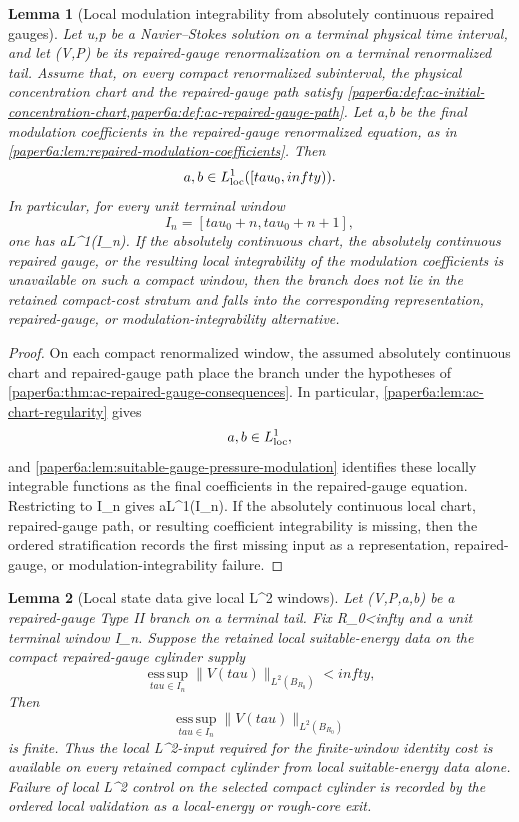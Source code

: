 \documentclass[11pt]{amsart}
\def\({}%
\def\){}%
\def\tau{tau}%
\def\infty{infty}%
\theoremstyle{plain}
\newtheorem{lemma}[lemma]{Lemma}
\theoremstyle{definition}
\theoremstyle{remark}
\begin{document}
\begin{lemma}[Local modulation integrability from absolutely continuous repaired gauges]
\label{paper7:lem:local-modulation-integrability}
Let \(u,p\) be a Navier--Stokes solution on a terminal physical time interval,
and let \((V,P)\) be its repaired-gauge renormalization on a terminal
renormalized tail.  Assume that, on every compact renormalized subinterval, the
physical concentration chart and the repaired-gauge path satisfy
\cref{paper6a:def:ac-initial-concentration-chart,paper6a:def:ac-repaired-gauge-path}.
Let \(a,b\) be the final modulation coefficients in the repaired-gauge
renormalized equation, as in
\cref{paper6a:lem:repaired-modulation-coefficients}.  Then
\[
  a,b\in L^1_{\rm loc}([\tau_0,\infty)).
\]
In particular, for every unit terminal window
\[
  I_n=[\tau_0+n,\tau_0+n+1],
\]
one has \(a\in L^1(I_n)\).  If the absolutely continuous chart, the
absolutely continuous repaired gauge, or the resulting local integrability of
the modulation coefficients is unavailable on such a compact window, then the
branch does not lie in the retained compact-cost stratum and falls into the
corresponding representation, repaired-gauge, or modulation-integrability
alternative.
\end{lemma}

\begin{proof}
On each compact renormalized window, the assumed absolutely continuous chart
and repaired-gauge path place the branch under the hypotheses of
\cref{paper6a:thm:ac-repaired-gauge-consequences}.  In particular,
\cref{paper6a:lem:ac-chart-regularity} gives
\[
  a,b\in L^1_{\rm loc},
\]
and \cref{paper6a:lem:suitable-gauge-pressure-modulation} identifies these
locally integrable functions as the final coefficients in the repaired-gauge
equation.  Restricting to \(I_n\) gives \(a\in L^1(I_n)\).  If the absolutely
continuous local chart, repaired-gauge path, or resulting coefficient
integrability is missing, then the ordered stratification records the first
missing input as a representation, repaired-gauge, or modulation-integrability
failure.
\end{proof}

\begin{lemma}[Local state data give local \(L^2\) windows]
\label{paper7:lem:local-state-data-local-l2}
Let \((V,P,a,b)\) be a repaired-gauge Type II branch on a terminal tail.
Fix \(R_0<\infty\) and a unit terminal window \(I_n\).  Suppose the retained
local suitable-energy data on the compact repaired-gauge cylinder supply
\[
  \operatorname*{ess\,sup}_{\tau\in I_n}
  \|V(\tau)\|_{L^2(B_{R_0})}<\infty,
\]
Then
\[
  \operatorname*{ess\,sup}_{\tau\in I_n}
  \|V(\tau)\|_{L^2(B_{R_0})}
\]
is finite.  Thus the local \(L^2\)-input required for the finite-window
identity cost is available on every retained compact cylinder from local
suitable-energy data alone.  Failure of local \(L^2\) control on the selected
compact cylinder is recorded by the ordered local validation as a local-energy
or rough-core exit.
\end{lemma}
\end{document}
